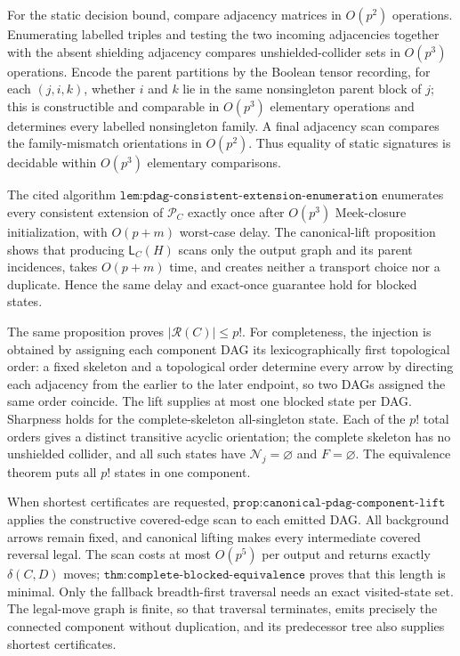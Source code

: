 For the static decision bound, compare adjacency matrices in \(O(p^2)\) operations. Enumerating labelled triples and testing the two incoming adjacencies together with the absent shielding adjacency compares unshielded-collider sets in \(O(p^3)\) operations. Encode the parent partitions by the Boolean tensor recording, for each \((j,i,k)\), whether \(i\) and \(k\) lie in the same nonsingleton parent block of \(j\); this is constructible and comparable in \(O(p^3)\) elementary operations and determines every labelled nonsingleton family. A final adjacency scan compares the family-mismatch orientations in \(O(p^2)\). Thus equality of static signatures is decidable within \(O(p^3)\) elementary comparisons.

The cited algorithm \(\texttt{lem:pdag-consistent-extension-enumeration}\) enumerates every consistent extension of \(\mathcal P_C\) exactly once after \(O(p^3)\) Meek-closure initialization, with \(O(p+m)\) worst-case delay. The canonical-lift proposition shows that producing \(\mathsf L_C(H)\) scans only the output graph and its parent incidences, takes \(O(p+m)\) time, and creates neither a transport choice nor a duplicate. Hence the same delay and exact-once guarantee hold for blocked states.

The same proposition proves \(|\mathcal R(C)|\leq p!\). For completeness, the injection is obtained by assigning each component DAG its lexicographically first topological order: a fixed skeleton and a topological order determine every arrow by directing each adjacency from the earlier to the later endpoint, so two DAGs assigned the same order coincide. The lift supplies at most one blocked state per DAG. Sharpness holds for the complete-skeleton all-singleton state. Each of the \(p!\) total orders gives a distinct transitive acyclic orientation; the complete skeleton has no unshielded collider, and all such states have \(\mathcal N_j=\varnothing\) and \(F=\varnothing\). The equivalence theorem puts all \(p!\) states in one component.

When shortest certificates are requested, \(\texttt{prop:canonical-pdag-component-lift}\) applies the constructive covered-edge scan to each emitted DAG. All background arrows remain fixed, and canonical lifting makes every intermediate covered reversal legal. The scan costs at most \(O(p^5)\) per output and returns exactly \(\delta(C,D)\) moves; \(\texttt{thm:complete-blocked-equivalence}\) proves that this length is minimal. Only the fallback breadth-first traversal needs an exact visited-state set. The legal-move graph is finite, so that traversal terminates, emits precisely the connected component without duplication, and its predecessor tree also supplies shortest certificates.

